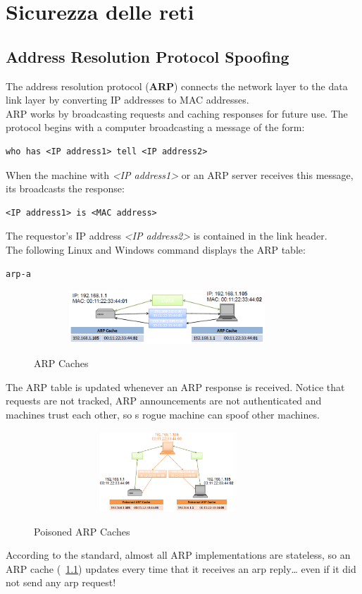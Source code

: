 \chapter{Sicurezza delle reti}
\section{Address Resolution Protocol Spoofing}
The address resolution protocol (\textbf{ARP}) connects the network layer to the data link layer by converting IP addresses to MAC addresses. \\
ARP works by broadcasting requests and caching responses for future use. The protocol begins with a computer broadcasting a message of the form: 
\begin{lstlisting}
who has <IP address1> tell <IP address2>
\end{lstlisting}
When the machine with \textit{<IP address1>} or an ARP server receives this message, its broadcasts the response:
\begin{lstlisting}
<IP address1> is <MAC address>
\end{lstlisting}
The requestor's IP address \textit{<IP address2>} is contained in the link header.\\
The following Linux and Windows command displays the ARP table:
\begin{lstlisting}
arp-a
\end{lstlisting}
\begin{figure}[htbp]
	\centering%
	\subfigure%
	{\includegraphics[height=2cm, width=10cm, keepaspectratio]{Immagini/reti/ARP_Caches.png}}
	\caption{ARP Caches\label{fig:ARP_Caches}} 	
\end{figure}
The ARP table is updated whenever an ARP response is received. Notice that requests are not tracked, ARP announcements are not authenticated and machines trust each other, so s rogue machine can spoof other machines.\begin{figure}[htbp]
	\centering%
	\subfigure%
	{\includegraphics[height=3cm, width=10cm, keepaspectratio]{Immagini/reti/Poisoned_ARP_Caches.png}}
	\caption{Poisoned ARP Caches\label{fig:Poisoned_ARP_Caches}} 	
\end{figure}
According to the standard, almost all ARP implementations are stateless, so an ARP cache (\figurename ~\ref{fig:ARP_Caches}) updates every time that it receives an arp reply… even if it did not send any arp request!


